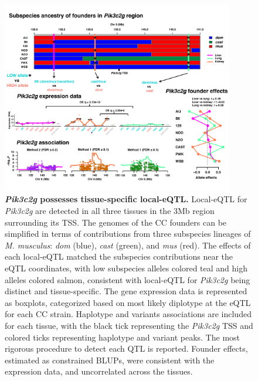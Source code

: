 \documentclass[9pt,twocolumn,twoside]{gsajnl}
\begin{document}
\begin{figure}[h]
\renewcommand{\familydefault}{\sfdefault}\normalfont
\centering
\includegraphics[width=0.9\textwidth, trim={0in 0.5in 0in 0in}, clip]{figs/pik3c2g_example.pdf}
\caption{\textbf{\textit{Pik3c2g} possesses tissue-specific local-eQTL.} Local-eQTL for \textit{Pik3c2g} are detected in all three tissues in the 3Mb region surrounding its TSS. The genomes of the CC founders can be simplified in terms of contributions from three subspecies lineages of \textit{M. musculus}: \textit{dom} (blue), \textit{cast} (green), and \textit{mus} (red). The effects of each local-eQTL matched the subspecies contributions near the eQTL coordinates, with low subspecies alleles colored teal and high alleles colored salmon, consistent with local-eQTL for \textit{Pik3c2g} being distinct and tissue-specific. The gene expression data is represented as boxplots, categorized based on most likely diplotype at the eQTL for each CC strain. Haplotype and variants associations are included for each tissue, with the black tick representing the \textit{Pik3c2g} TSS and colored ticks representing haplotype and variant peaks. The most rigorous procedure to detect each QTL is reported. Founder effects, estimated as constrained BLUPs, were consistent with the expression data, and uncorrelated across the tissues.\label{fig:pik3c2g}}
\end{figure}
\end{document}

